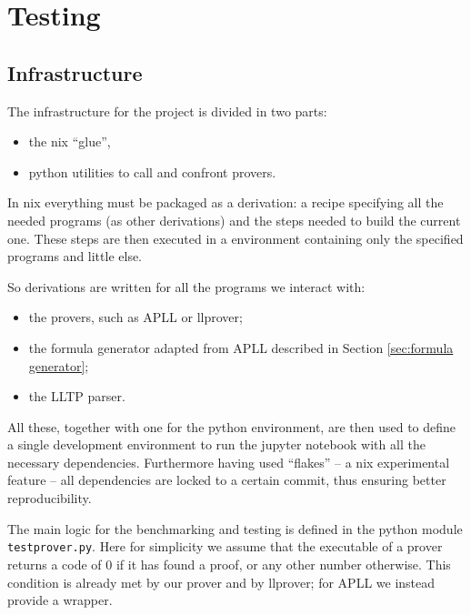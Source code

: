\chapter{Testing}
\section{Infrastructure}
The infrastructure for the project is divided in two parts:
\begin{itemize}
	\item the nix ``glue'',		%
	\item python utilities to call and confront provers.
\end{itemize}
In nix everything must be packaged as a derivation: a recipe specifying all the needed programs (as other derivations) and the steps needed to build the current one.
These steps are then executed in a environment containing only the specified programs and little else.

So derivations are written for all the programs we interact with:
\begin{itemize}
	\item the provers, such as APLL or llprover;
	\item the formula generator adapted from APLL described in Section \ref{sec:formula generator};
	\item the LLTP parser.
\end{itemize}
All these, together with one for the python environment, are then used to define a single development environment to run the jupyter notebook with all the necessary dependencies.
Furthermore having used ``flakes'' -- a nix experimental feature -- all dependencies are locked to a certain commit, thus ensuring better reproducibility.

The main logic for the benchmarking and testing is defined in the python module \texttt{testprover.py}.
Here for simplicity we assume that the executable of a prover returns a code of 0 if it has found a proof, or any other number otherwise.
This condition is already met by our prover and by llprover; for APLL we instead provide a wrapper.

